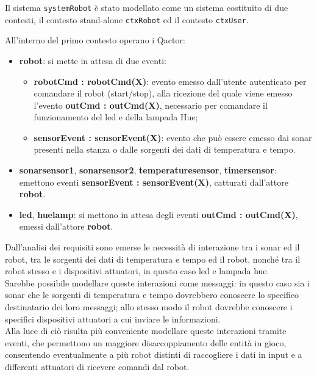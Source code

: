 \documentclass{llncs}
\newcommand{\action}[1]{\texttt{#1}\xspace}
\begin{document}
Il sistema \action{systemRobot} è stato modellato come un sistema costituito di due contesti, il contesto stand-alone \action{ctxRobot} ed il contesto \action{ctxUser}. 

All'interno del primo contesto operano i Qactor:
\begin{itemize}
	\item \textbf{robot}: si mette in attesa di due eventi: 
	\begin{itemize}
		\item \textbf{robotCmd : robotCmd(X)}: evento emesso dall'utente autenticato per comandare il robot (start/stop), alla ricezione del quale viene emesso l'evento \textbf{outCmd : outCmd(X)}, necessario per comandare il funzionamento del led e della lampada Hue;
		\item \textbf{sensorEvent : sensorEvent(X)}: evento che può essere emesso dai sonar presenti nella stanza o dalle sorgenti dei dati di temperatura e tempo.
	\end{itemize}
	 \item \textbf{sonarsensor1}, \textbf{sonarsensor2}, \textbf{temperaturesensor}, \textbf{timersensor}: emettono eventi \textbf{sensorEvent : sensorEvent(X)}, catturati dall'attore \textbf{robot}.
	 \item \textbf{led}, \textbf{huelamp}: si mettono in attesa 
	 degli eventi \textbf{outCmd : outCmd(X)}, emessi dall'attore \textbf{robot}. 
\end{itemize}
Dall'analisi dei requisiti sono emerse le necessità di interazione tra i sonar ed il robot, tra le sorgenti dei dati di temperatura e tempo ed il robot, nonché tra il robot stesso e i dispositivi attuatori, in questo caso led e lampada hue. \\
Sarebbe possibile modellare queste interazioni come messaggi: in questo caso sia i sonar che le sorgenti di temperatura e tempo dovrebbero conoscere lo specifico destinatario dei loro messaggi; allo stesso modo il robot dovrebbe conoscere i specifici dispositivi attuatori a cui inviare le informazioni. \\
Alla luce di ciò risulta più conveniente modellare queste interazioni tramite eventi, che permettono un maggiore disaccoppiamento delle entità in gioco, consentendo eventualmente a più robot distinti di raccogliere i dati in input e a differenti attuatori di ricevere comandi dal robot. \\
\end{document}
